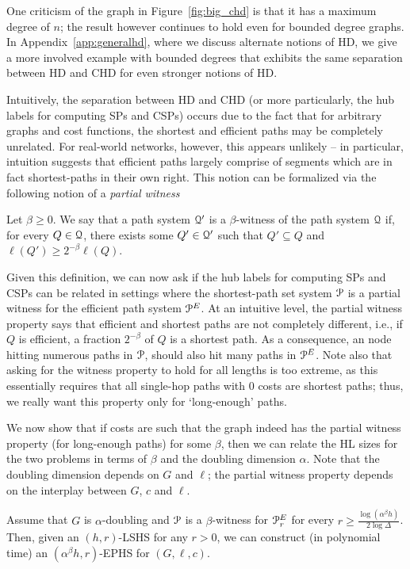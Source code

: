 \begin{remark}
One criticism of the graph in Figure~\ref{fig:big_chd} is that it has a maximum degree of $n$; the result however continues to hold even for bounded degree graphs.
In Appendix~\ref{app:generalhd}, where we discuss alternate notions of HD, we give a more involved example with bounded degrees that exhibits the same separation between HD and CHD for even stronger notions of HD.
\end{remark}

Intuitively, the separation between HD and CHD (or more particularly, the hub labels for computing SPs and CSPs) occurs due to the fact that for arbitrary graphs and cost functions, the shortest and efficient paths may be completely unrelated. 
For real-world networks, however, this appears unlikely -- in particular, intuition suggests that efficient paths largely comprise of segments which are in fact shortest-paths in their own right. This notion can be formalized via the following notion of a \emph{partial witness} 
\begin{definition}
Let $\beta\geq 0$.
We say that a path system $\mathcal{Q}'$ is a $\beta$-witness of the path system $\mathcal{Q}$ if, for every $Q\in\mathcal{Q}$, there exists some $Q'\in\mathcal{Q}'$ such that $Q'\subseteq Q$ and $\ell(Q')\geq 2^{-\beta}\ell(Q)$.
\end{definition}
Given this definition, we can now ask if the hub labels for computing SPs and CSPs can be related in settings where the shortest-path set system $\mathcal{P}$ is a partial witness for the efficient path system $\mathcal{P}^E$. At an intuitive level, the partial witness property says that efficient and shortest paths are not completely different, i.e., if $Q$ is efficient, a fraction $2^{-\beta}$ of $Q$ is a shortest path.
As a consequence, an node hitting numerous paths in $\mathcal{P}$, should also hit many paths in $\mathcal{P}^E$.
Note also that asking for the witness property to hold for all lengths is too extreme, as this essentially requires that all single-hop paths with 0 costs are shortest paths; thus, we really want this property only for `long-enough' paths. 


We now show that if costs are such that the graph indeed has the partial witness property (for long-enough paths) for some $\beta$, then we can relate the HL sizes for the two problems in terms of $\beta$ and the doubling dimension $\alpha$. Note that the doubling dimension depends on $G$ and $\ell$; the partial witness property depends on the interplay between $G$, $c$ and $\ell$.
\begin{theorem}\label{theo:witness_doubling}
Assume that $G$ is $\alpha$-doubling and $\mathcal{P}$ is a $\beta$-witness for $\mathcal{P}^E_r$ for every $r\geq \frac{\log(\alpha^\beta h)}{2\log\Delta}$. 
Then, given an $(h,r)$-LSHS for any $r>0$, we can construct (in polynomial time) an $(\alpha^{\beta} h,r)$-EPHS for $(G,\ell,c)$. 
\end{theorem}

